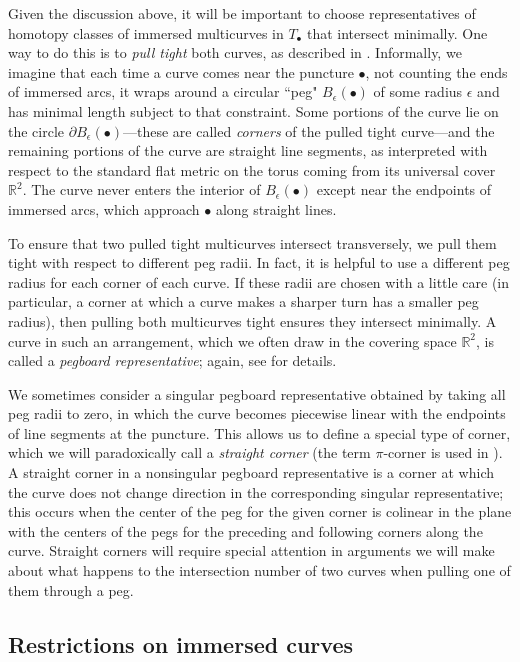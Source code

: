 \documentclass[11pt]{amsart}
\numberwithin{equation}{section}
\numberwithin{theorem}{section}
\theoremstyle{definition}
\newcommand{\R}{\mathbb{R}}
\begin{document}
Given the discussion above, it will be important to choose representatives of homotopy classes of immersed multicurves in $T_\bullet$ that intersect minimally. One way to do this is to \emph{pull tight} both curves, as described in \cite[Section 7.1]{hrw}. Informally, we imagine that each time a curve comes near the puncture $\bullet$, not counting the ends of immersed arcs, it wraps around a circular ``peg" $B_\epsilon(\bullet)$ of some radius $\epsilon$ and has minimal length subject to that constraint. Some portions of the curve lie on the circle $\partial B_\epsilon(\bullet)$---these are called \emph{corners} of the pulled tight curve---and the remaining portions of the curve are straight line segments, as interpreted with respect to the standard flat metric on the torus coming from its universal cover $\R^2$. The curve never enters the interior of $B_\epsilon(\bullet)$ except near the endpoints of immersed arcs, which approach $\bullet$ along straight lines. 

To ensure that two pulled tight multicurves intersect transversely, we pull them tight with respect to different peg radii. In fact, it is helpful to use a different peg radius for each corner of each curve. If these radii are chosen with a little care (in particular, a corner at which a curve makes a sharper turn has a smaller peg radius), then pulling both multicurves tight ensures they intersect minimally. A curve in such an arrangement, which we often draw in the covering space $\R^2$, is called a \emph{pegboard representative}; again, see \cite[\S7]{hrw} for details.

We sometimes consider a singular pegboard representative obtained by taking all peg radii to zero, in which the curve becomes piecewise linear with the endpoints of line segments at the puncture. This allows us to define a special type of corner, which we will paradoxically call a \emph{straight corner} (the term $\pi$-corner is used in \cite{hrw}). A straight corner in a nonsingular pegboard representative is a corner at which the curve does not change direction in the corresponding singular representative; this occurs when the center of the peg for the given corner is colinear in the plane with the centers of the pegs for  the preceding and following corners along the curve. Straight corners will require special attention in arguments we will make about what happens to the intersection number of two curves when  pulling one of them through a peg.

\subsection{Restrictions on immersed curves}
\end{document}
